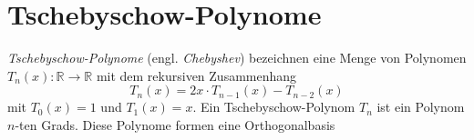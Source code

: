 \section{Tschebyschow-Polynome}

\emph{Tschebyschow-Polynome} (engl. \emph{Chebyshev}) bezeichnen eine Menge von Polynomen $T_n(x) \colon \mathbb{R} \to \mathbb{R}$ mit dem rekursiven Zusammenhang
\begin{equation}
  T_n(x) = 2x \cdot T_{n-1}(x) - T_{n-2}(x)
\end{equation}
mit $T_0(x) = 1$ und $T_1(x) = x$.
Ein Tschebyschow-Polynom $T_n$ ist ein Polynom $n$-ten Grads.
Diese Polynome formen eine Orthogonalbasis
